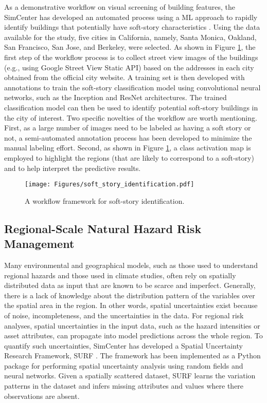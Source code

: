 As a demonstrative workflow on visual screening of building features, the SimCenter has developed an automated process using a ML approach to rapidly identify buildings that potentially have soft-story characteristics \citep{yu2019building, yu2020largescale}. Using the data available for the study, five cities in California, namely, Santa Monica, Oakland, San Francisco, San Jose, and Berkeley, were selected. As shown in Figure \ref{fig:soft_story_identification}, the first step of the workflow process is to collect street view images of the buildings (e.g., using Google Street View Static API) based on the addresses in each city obtained from the official city website. A training set is then developed with annotations to train the soft-story classification model using convolutional neural networks, such as the Inception \citep{szegedy2016rethinking,szegedy2017inceptionv4} and ResNet \citep{he2016deep} architectures. The trained classification model can then be used to identify potential soft-story buildings in the city of interest. Two specific novelties of the workflow are worth mentioning. First, as a large number of images need to be labeled as having a soft story or not, a semi-automated annotation process has been developed to minimize the manual labeling effort. Second, as shown in Figure \ref{fig:soft_story_identification}, a class activation map \citep{zhou2016learning} is employed to highlight the regions (that are likely to correspond to a soft-story) and to help interpret the predictive results.

\begin{figure}[htb]
    \centering
    \texttt{[image: Figures/soft\_story\_identification.pdf]}
    \caption{A workflow framework for soft-story identification.}
    \label{fig:soft_story_identification}
\end{figure}

\subsection{Regional-Scale Natural Hazard Risk Management }

Many environmental and geographical models, such as those used to understand regional hazards and those used in climate studies, often rely on spatially distributed data as input that are known to be scarce and imperfect. Generally, there is a lack of knowledge about the distribution pattern of the variables over the spatial area in the region. In other words, spatial uncertainties exist because of noise, incompleteness, and the uncertainties in the data. For regional risk analyses, spatial uncertainties in the input data, such as the hazard intensities or asset attributes, can propagate into model predictions across the whole region. To quantify such uncertainties, SimCenter has developed a Spatial Uncertainty Research Framework, SURF \citep{wang2019surf}. The framework has been implemented as a Python package for performing spatial uncertainty analysis using random fields and neural networks. Given a spatially scattered dataset, SURF learns the variation patterns in the dataset and infers missing attributes and values where there observations are absent. 

